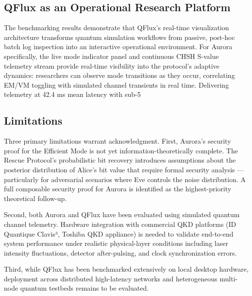 {{{{{{\subsection{QFlux as an Operational Research Platform}
The benchmarking results demonstrate that QFlux's real-time visualization architecture transforms quantum simulation workflows from passive, post-hoc batch log inspection into an interactive operational environment. For Aurora specifically, the live mode indicator panel and continuous CHSH S-value telemetry stream provide real-time visibility into the protocol's adaptive dynamics: researchers can observe mode transitions as they occur, correlating EM/VM toggling with simulated channel transients in real time. Delivering telemetry at 42.4 ms mean latency with sub-5%

\subsection{Limitations}
Three primary limitations warrant acknowledgment. First, Aurora's security proof for the Efficient Mode is not yet information-theoretically complete. The Rescue Protocol's probabilistic bit recovery introduces assumptions about the posterior distribution of Alice's bit value that require formal security analysis — particularly for adversarial scenarios where Eve controls the noise distribution. A full composable security proof for Aurora is identified as the highest-priority theoretical follow-up.

Second, both Aurora and QFlux have been evaluated using simulated quantum channel telemetry. Hardware integration with commercial QKD platforms (ID Quantique Clavis³, Toshiba QKD appliance) is needed to validate end-to-end system performance under realistic physical-layer conditions including laser intensity fluctuations, detector after-pulsing, and clock synchronization errors.

Third, while QFlux has been benchmarked extensively on local desktop hardware, deployment across distributed high-latency networks and heterogeneous multi-node quantum testbeds remains to be evaluated.

}}}}}}
